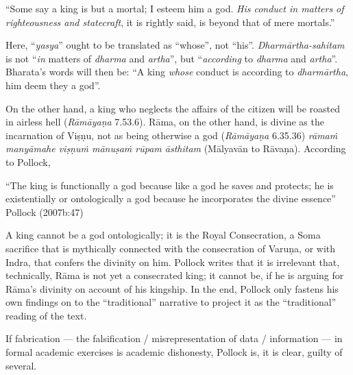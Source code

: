 \begin{myquote}
“Some say a king is but a mortal; I esteem him a god. {\sl His conduct in matters of righteousness and statecraft}, it is rightly said, is beyond that of mere mortals.” 
\end{myquote}

Here, “{\sl yasya}” ought to be translated as “whose”, not “his”. {\sl Dharmārtha-sahitam} is not “{\sl in} matters of {\sl dharma} and {\sl artha}'', but ``{\sl according} to {\sl dharma} and {\sl artha}''. Bharata’s words will then be: “A king {\sl whose} conduct is according to {\sl dharmārtha}, him deem they a god”. 

On the other hand, a king who neglects the affairs of the citizen will be roasted in airless hell ({\sl Rāmāyaṇa} 7.53.6). Rāma, on the other hand, is divine as the incarnation of Viṣṇu, not as being otherwise a god ({\sl Rāmāyaṇa} 6.35.36) {\sl rāmaṁ manyāmahe viṣṇuṁ mānuṣaṁ rūpam āsthitam} (Mālyavān to Rāvaṇa). According to Pollock, 

\begin{myquote}
“The king is functionally a god because like a god he saves and protects; he is existentially or ontologically a god because he incorporates the divine essence”
\hfill Pollock (2007b:47)
\end{myquote}

A king cannot be a god ontologically; it is the Royal Consecration, a Soma sacrifice that is mythically connected with the consecration of Varuṇa, or with Indra, that confers the divinity on him. Pollock writes that it is irrelevant that, technically, Rāma is not yet a consecrated king; it cannot be, if he is arguing for Rāma’s divinity on account of his kingship. In the end, Pollock only fastens his own findings on to the “traditional” narrative to project it as the “traditional” reading of the text. 

If fabrication --- the falsification / misrepresentation of data / information ---  in formal academic exercises is academic dishonesty, Pollock is, it is clear, guilty of several.
